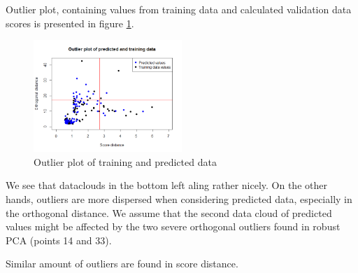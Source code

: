 \documentclass[12pt]{article}
\begin{document}
Outlier plot, containing values from training data and calculated validation data scores is presented in figure \ref{fig:outlierPred}.
\begin{figure}[h!]
  \begin{center}
    \centering
    \includegraphics[width=0.5\textwidth]{../images/outlierPred.png}
    \caption{Outlier plot of training and predicted data}
    \label{fig:outlierPred}
  \end{center}
\end{figure}

We see that dataclouds in the bottom left aling rather nicely. On the other hands, outliers are more dispersed when 
considering predicted data, especially in the orthogonal distance. We assume that the second data cloud of predicted values might 
be affected by the two severe orthogonal outliers found in robust PCA (points 14 and 33). 

Similar amount of outliers are found in score distance.
\end{document}
